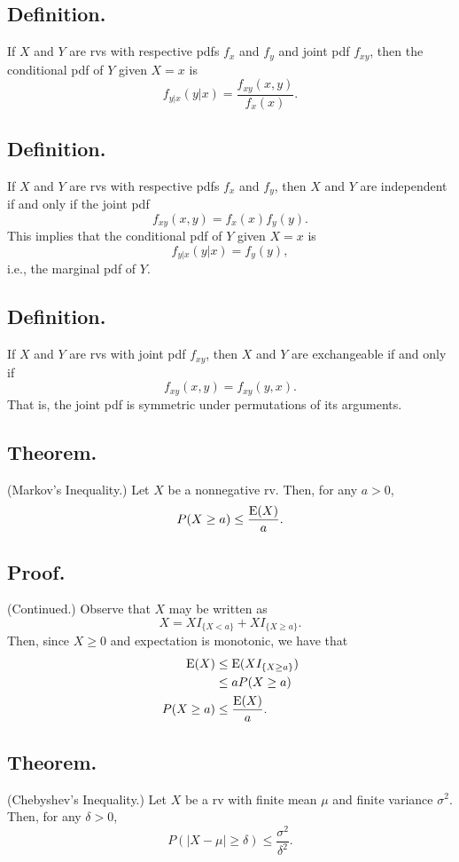 \documentclass[titlepage]{article}
\begin{document}
\subsection{Definition.} If $X$ and $Y$ are rvs with respective pdfs $f_{x}$ and $f_{y}$ and joint pdf $f_{xy}$, then the conditional pdf of $Y$ given $X = x$ is
$$f_{y|x}(y|x) = \frac{f_{xy}(x, y)}{f_{x}(x)}.$$

\subsection{Definition.} If $X$ and $Y$ are rvs with respective pdfs $f_{x}$ and $f_{y}$, then $X$ and $Y$ are independent if and only if the joint pdf 
$$f_{xy}(x, y) = f_{x}(x)f_{y}(y).$$
This implies that the conditional pdf of $Y$ given $X = x$ is
$$f_{y|x}(y|x) = f_{y}(y),$$
i.e., the marginal pdf of $Y$.

\subsection{Definition.} If $X$ and $Y$ are rvs with joint pdf $f_{xy}$, then $X$ and $Y$ are exchangeable if and only if 
$$f_{xy}(x, y) = f_{xy}(y, x).$$
That is, the joint pdf is symmetric under permutations of its arguments.

\subsection{Theorem.} (Markov's Inequality.) Let $X$ be a nonnegative rv. Then, for any $a > 0$, 
$$P(X \geq a) \leq \frac{\text{E}(X)}{a}.$$

\subsection{Proof.} (Continued.) Observe that $X$ may be written as 
$$X = XI_{\{X < a\}} + XI_{\{X \geq a\}}.$$
Then, since $X \geq 0$ and expectation is monotonic, we have that 
\begin{align*}
          \text{E}(X) &\leq \text{E}(XI_{\{X \geq a\}}) \\
                &\leq aP(X \geq a) \\
    P(X \geq a) &\leq \frac{\text{E}(X)}{a}.
\end{align*}

\subsection{Theorem.} (Chebyshev's Inequality.) Let $X$ be a rv with finite mean $\mu$ and finite variance $\sigma^{2}$. Then, for any $\delta > 0$, 
$$P(|X - \mu| \geq \delta) \leq \frac{\sigma^{2}}{\delta^{2}}.$$
\end{document}
